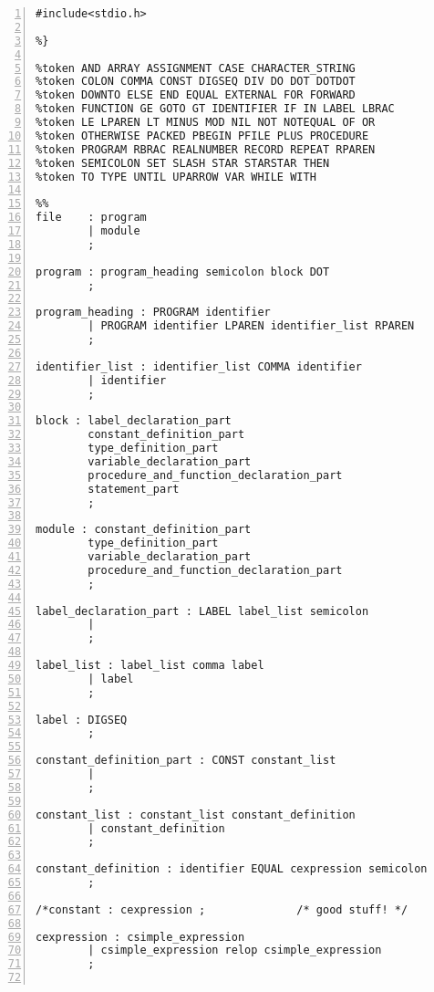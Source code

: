 
\renewcommand{\theFancyVerbLine}{%
{\small
sa.\arabic{FancyVerbLine}}}
\begin{Verbatim}[numbers=left]
#include<stdio.h>

%}

%token AND ARRAY ASSIGNMENT CASE CHARACTER_STRING
%token COLON COMMA CONST DIGSEQ DIV DO DOT DOTDOT
%token DOWNTO ELSE END EQUAL EXTERNAL FOR FORWARD
%token FUNCTION GE GOTO GT IDENTIFIER IF IN LABEL LBRAC
%token LE LPAREN LT MINUS MOD NIL NOT NOTEQUAL OF OR
%token OTHERWISE PACKED PBEGIN PFILE PLUS PROCEDURE
%token PROGRAM RBRAC REALNUMBER RECORD REPEAT RPAREN
%token SEMICOLON SET SLASH STAR STARSTAR THEN
%token TO TYPE UNTIL UPARROW VAR WHILE WITH

%%
file    : program
        | module
        ;

program : program_heading semicolon block DOT
        ;

program_heading : PROGRAM identifier
        | PROGRAM identifier LPAREN identifier_list RPAREN
        ;

identifier_list : identifier_list COMMA identifier
        | identifier
        ;

block : label_declaration_part
        constant_definition_part
        type_definition_part
        variable_declaration_part
        procedure_and_function_declaration_part
        statement_part
        ;

module : constant_definition_part
        type_definition_part
        variable_declaration_part
        procedure_and_function_declaration_part
        ;

label_declaration_part : LABEL label_list semicolon
        |
        ;

label_list : label_list comma label
        | label
        ;

label : DIGSEQ
        ;

constant_definition_part : CONST constant_list
        |
        ;

constant_list : constant_list constant_definition
        | constant_definition
        ;

constant_definition : identifier EQUAL cexpression semicolon
        ;

/*constant : cexpression ;              /* good stuff! */
                                             
cexpression : csimple_expression
        | csimple_expression relop csimple_expression
        ;


\end{Verbatim}
